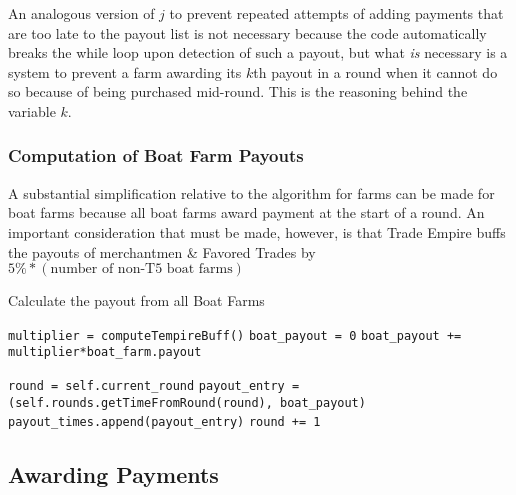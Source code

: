 \documentclass[12pt,letterpaper]{article}
\theoremstyle{remark}
\theoremstyle{plain}
\begin{document}
An analogous version of $j$ to prevent repeated attempts of adding payments that are too late to the payout list is not necessary because the code automatically breaks the while loop upon detection of such a payout, but what \textit{is} necessary is a system to prevent a farm awarding its $k$th payout in a round when it cannot do so because of being purchased mid-round. This is the reasoning behind the variable $k$. 

\subsubsection{Computation of Boat Farm Payouts}

A substantial simplification relative to the algorithm for farms can be made for boat farms because all boat farms award payment at the start of a round. An important consideration that must be made, however, is that Trade Empire buffs the payouts of merchantmen \& Favored Trades by $5\%*(\text{number of non-T5 boat farms})$

\begin{algorithm}
\caption{Calculate the payout from all Boat Farms}
\begin{algorithmic}
\State \texttt{multiplier = computeTempireBuff()}
\State \texttt{boat\_payout = 0}
    \State \texttt{boat\_payout += multiplier*boat\_farm.payout}
\EndFor

\State \texttt{round = self.current\_round}
    \State \texttt{payout\_entry = (self.rounds.getTimeFromRound(round), boat\_payout)}
    \State \texttt{payout\_times.append(payout\_entry)}   
    \State \texttt{round += 1}
\EndWhile
\end{algorithmic}
\end{algorithm}

\subsection{Awarding Payments}\label{awarding payments}
\end{document}
